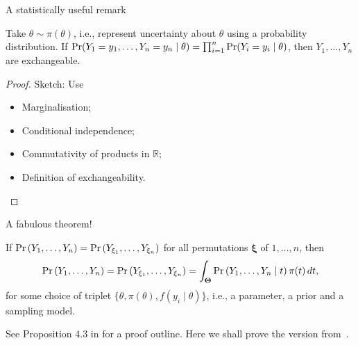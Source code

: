 \begin{frame}{A statistically useful remark}
 \begin{remark}
  \label{rmk:pre_deFinetti}
  Take $\theta \sim \pi(\theta)$, i.e., represent uncertainty about $\theta$ using a probability distribution. 
  If $ \operatorname{Pr}(Y_1 = y_1, \ldots, Y_{n} = y_n \mid \theta) = \prod_{i=1}^{n} \operatorname{Pr}(Y_i = y_i \mid \theta)$, then $Y_1, \ldots, Y_{n}$ are exchangeable.
 \end{remark}
 \begin{proof}
  Sketch:
  Use
  \begin{itemize}
   \item Marginalisation;
   \item Conditional independence;
   \item Commutativity of products in $\mathbb{R}$;
   \item Definition of exchangeability.
  \end{itemize}
 \end{proof}
\end{frame}
\begin{frame}{A fabulous theorem!}
 \begin{theo}
  If $\operatorname{Pr}\left(Y_1, \ldots, Y_n\right) = \operatorname{Pr}\left(Y_{\xi_1}, \ldots, Y_{\xi_n}\right)$ for all permutations $\boldsymbol{\xi}$ of $1, \ldots, n$, then
  \begin{equation}
   \operatorname{Pr}\left(Y_1, \ldots, Y_n\right) = \operatorname{Pr}\left(Y_{\xi_1}, \ldots, Y_{\xi_n}\right) = \int_{\boldsymbol{\Theta}} \operatorname{Pr}\left(Y_1, \ldots, Y_n \mid t\right) \pi(t)\,dt,
  \end{equation}
for some choice of triplet $\{ \theta,  \pi(\theta), f(y_i \mid \theta) \}$, i.e., a parameter, a prior and a sampling model.
 \end{theo}
 See Proposition 4.3 in \cite{Bernardo2000} for a proof outline.
 Here we shall prove the version from~\cite{DeFinetti1931}.
\end{frame}
